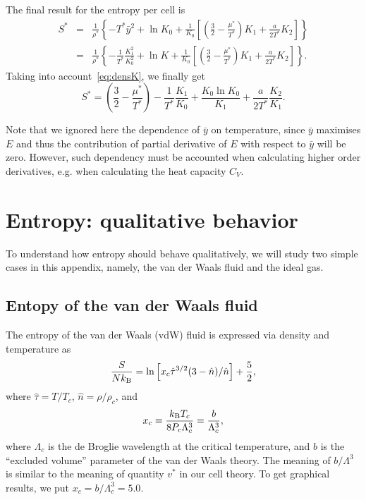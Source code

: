\documentclass[12pt]{article}
\numberwithin{equation}{section}
\begin{document}
	The final result for the entropy per cell is
	\begin{eqnarray}
		S^{*} & = & \frac{1}{\rho^*} \left\{ -T^* \bar{y}^2 + \ln K_0 + \frac{1}{K_0} \left[\left(\frac{3}{2} - \frac{\mu^*}{T^*} \right)K_1 + \frac{a}{2 T^*} K_2\right] \right\}
		\\
		& = & \frac{1}{\rho^*} \left\{ -\frac{1}{T^*} \frac{K_1^2}{K_0^2} + \ln K + \frac{1}{K_0} \left[\left(\frac{3}{2} - \frac{\mu^*}{T^*} \right)K_1 + \frac{a}{2 T^*} K_2\right] \right\}.
	\end{eqnarray}
	Taking into account~\eqref{eq:densK}, we finally get
	\begin{equation}
		S^* = \left(\frac{3}{2} - \frac{\mu^*}{T^*}\right) - \frac{1}{T^*}\frac{K_1}{K_0} + \frac{K_0 \ln K_0}{K_1} + \frac{a}{2T^*} \frac{K_2}{K_1}.
	\end{equation}
	
	Note that we ignored here the dependence of $\bar{y}$ on temperature, since $\bar{y}$ maximises $E$ and thus the contribution of partial derivative of $E$ with respect to $\bar{y}$ will be zero. However, such dependency must be accounted when calculating higher order derivatives, e.g. when calculating the heat capacity $C_V$.
	
	\section{Entropy: qualitative behavior}
	To understand how entropy should behave qualitatively, we will study two simple cases in this appendix, namely, the van der Waals fluid and the ideal gas.
	
	\subsection{Entopy of the van der Waals fluid}
	The entropy of the van der Waals (vdW) fluid is expressed via density and temperature as~\cite[(55)]{Johnston14}
	\begin{equation}
		\label{vdw:S}
		\frac{S}{N k_{\rm B}} = \ln \left[x_c\hat{\tau}^{3/2}(3-\hat{n})/\hat{n}\right] + \frac{5}{2},
	\end{equation}
	where $\hat{\tau} = T/T_c$, $\hat{n} = \rho/\rho_c$, and 
	\begin{equation}
		x_c \equiv \frac{k_{\rm B} T_c}{8P_c \Lambda^3_c} = \frac{b}{\Lambda^3_c},
	\end{equation}
	where $\Lambda_c$ is the de Broglie wavelength at the critical temperature, and $b$ is the ``excluded volume'' parameter of the van der Waals theory. The meaning of $b/\Lambda^3$ is similar to the meaning of quantity $v^*$ in our cell theory. To get graphical results, we put $x_c = b/\Lambda_c^3 = 5.0$.
	
\end{document}
